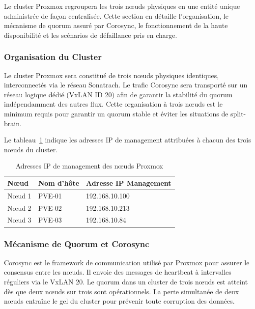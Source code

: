 \par Le cluster Proxmox regroupera les trois nœuds physiques en une entité unique administrée de façon centralisée. Cette section en détaille l'organisation, le mécanisme de quorum assuré par Corosync, le fonctionnement de la haute disponibilité et les scénarios de défaillance pris en charge.\\

\subsubsection{Organisation du Cluster}

\par Le cluster Proxmox sera constitué de trois nœuds physiques identiques, interconnectés via le réseau Sonatrach. Le trafic Corosync sera transporté sur un réseau logique dédié (VxLAN ID 20) afin de garantir la stabilité du quorum indépendamment des autres flux. Cette organisation à trois nœuds est le minimum requis pour garantir un quorum stable et éviter les situations de split-brain.\\

\par Le tableau~\ref{tab:ip-management} indique les adresses IP de management attribuées à chacun des trois nœuds du cluster.\\

\begin{table}[H]
\centering
\caption{Adresses IP de management des nœuds Proxmox}
\label{tab:ip-management}
\begin{tabular}{|l|l|l|}
\hline
\textbf{Nœud} & \textbf{Nom d'hôte} & \textbf{Adresse IP Management} \\
\hline
Nœud 1 & PVE-01 & 192.168.10.100 \\
\hline
Nœud 2 & PVE-02 & 192.168.10.213 \\
\hline
Nœud 3 & PVE-03 & 192.168.10.84 \\
\hline
\end{tabular}
\end{table}

\subsubsection{Mécanisme de Quorum et Corosync}

\par Corosync est le framework de communication utilisé par Proxmox pour assurer le consensus entre les nœuds. Il envoie des messages de heartbeat à intervalles réguliers via le VxLAN 20. Le quorum dans un cluster de trois nœuds est atteint dès que deux nœuds sur trois sont opérationnels. La perte simultanée de deux nœuds entraîne le gel du cluster pour prévenir toute corruption des données.\\

